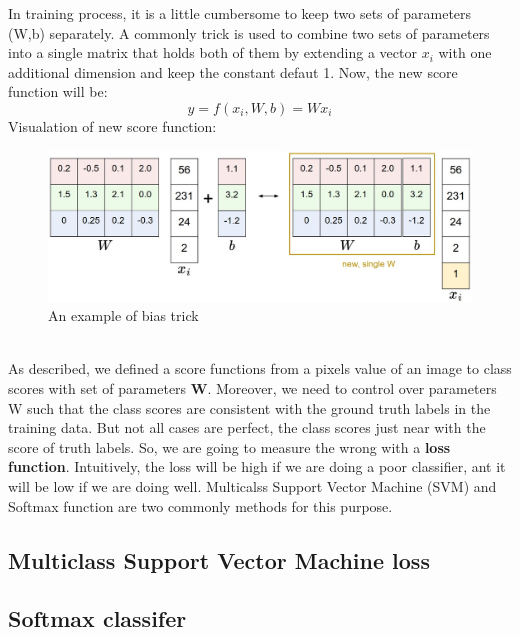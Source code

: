 In training process, it is a little cumbersome to keep two sets of parameters (W,b) separately. A commonly trick is used to combine two sets of parameters into a single matrix that holds both of them by extending a vector \textbf{$x_i$} with one additional dimension and keep the constant defaut 1. Now, the new score function will be:
\begin{equation}
	y = f(x_i,W,b) = Wx_i
\end{equation}
Visualation of new score function:
\begin{figure}[h]
	\centering
	\includegraphics[scale=0.3]{images/lncba}
	\caption{An example of bias trick}
	\label{figlncex}
\end{figure}~\\
As described, we defined a score functions from a pixels value of an image to class scores with set of parameters \textbf{W}. Moreover, we need to control over parameters W such that the class scores are consistent with the ground truth labels in the training data. But not all cases are perfect, the class scores just near with the score of truth labels. So, we are going to measure the wrong with a \textbf{loss function}. Intuitively, the loss will be high if we are doing a poor classifier, ant it will be low if we are doing well. Multicalss Support Vector Machine (SVM) and Softmax function are two commonly methods for this purpose.
\subsection{Multiclass Support Vector Machine loss}
\subsection{Softmax classifer}